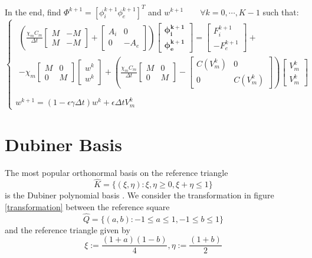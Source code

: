 \documentclass[a4paper,12pt]{article}
\begin{document}
In the end, find $\Phi^{k+1}=[\phi_i^{k+1} \phi_e^{k+1}]^T$ and $w^{k+1} \qquad \forall k=0, \cdots, K-1$ such that: 
\begin{equation}
\begin{cases}
\begin{gathered}
\left(
	\frac{\chi_m C_m}{\Delta t} \begin{bmatrix}M & -M \\ M & -M\end{bmatrix}
	+ \begin{bmatrix} A_i & 0 \\ 0 & -A_e \end{bmatrix}
	\right) \begin{bmatrix} \bm{\phi_i^{k+1}} \\ \bm{\phi_e^{k+1}}  \end{bmatrix} =
	\begin{bmatrix} F_i^{k+1} \\ -F_e^{k+1} \end{bmatrix} + \\ -
	\chi_m\begin{bmatrix} M & 0 \\ 0 & M \end{bmatrix} \begin{bmatrix} w^k \\ w^k \end{bmatrix} +
	\left(\frac{\chi_mC_m}{\Delta t}\begin{bmatrix} M & 0 \\ 0 & M \end{bmatrix}
	- \begin{bmatrix} C(V_m^k) & 0 \\ 0 & C(V_m^k)\end{bmatrix} 
	\right) \begin{bmatrix} V_m^k \\ V_m^k \end {bmatrix}
	 \end{gathered} \\ \\
	w^{k+1} = (1-\epsilon \gamma \Delta t) w^k + \epsilon \Delta tV_m^k
\end{cases}
\end{equation}



\section{Dubiner Basis}
    The most popular orthonormal basis on the reference triangle
    \begin{equation}
    \hat{K}=\{ (\xi, \eta) : \xi, \eta \ge 0,	\xi+\eta \le 1 \}
    \end{equation}
    is the Dubiner polynomial basis \cite{antonietti}. We consider the transformation in figure \ref{transformation} between the reference square
    \begin{equation}
    \hat{Q}=\{ (a, b) : -1 \le a \le 1, -1 \le b \le 1 \}
    \end{equation}
    and the reference triangle given by
    \begin{equation}
    \xi:=\frac{(1+a)(1-b)}{4},  \eta:=\frac{(1+b)}{2}
    \end{equation}
    
\end{document}
